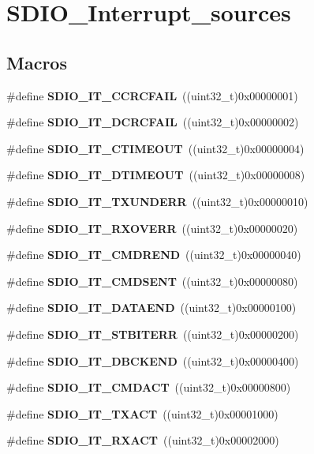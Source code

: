 \section{S\+D\+I\+O\+\_\+\+Interrupt\+\_\+sources}
\label{group__SDIO__Interrupt__sources}
\subsection*{Macros}
\begin{DoxyCompactItemize}
\item 
\#define \textbf{ S\+D\+I\+O\+\_\+\+I\+T\+\_\+\+C\+C\+R\+C\+F\+A\+IL}~((uint32\+\_\+t)0x00000001)
\item 
\#define \textbf{ S\+D\+I\+O\+\_\+\+I\+T\+\_\+\+D\+C\+R\+C\+F\+A\+IL}~((uint32\+\_\+t)0x00000002)
\item 
\#define \textbf{ S\+D\+I\+O\+\_\+\+I\+T\+\_\+\+C\+T\+I\+M\+E\+O\+UT}~((uint32\+\_\+t)0x00000004)
\item 
\#define \textbf{ S\+D\+I\+O\+\_\+\+I\+T\+\_\+\+D\+T\+I\+M\+E\+O\+UT}~((uint32\+\_\+t)0x00000008)
\item 
\#define \textbf{ S\+D\+I\+O\+\_\+\+I\+T\+\_\+\+T\+X\+U\+N\+D\+E\+RR}~((uint32\+\_\+t)0x00000010)
\item 
\#define \textbf{ S\+D\+I\+O\+\_\+\+I\+T\+\_\+\+R\+X\+O\+V\+E\+RR}~((uint32\+\_\+t)0x00000020)
\item 
\#define \textbf{ S\+D\+I\+O\+\_\+\+I\+T\+\_\+\+C\+M\+D\+R\+E\+ND}~((uint32\+\_\+t)0x00000040)
\item 
\#define \textbf{ S\+D\+I\+O\+\_\+\+I\+T\+\_\+\+C\+M\+D\+S\+E\+NT}~((uint32\+\_\+t)0x00000080)
\item 
\#define \textbf{ S\+D\+I\+O\+\_\+\+I\+T\+\_\+\+D\+A\+T\+A\+E\+ND}~((uint32\+\_\+t)0x00000100)
\item 
\#define \textbf{ S\+D\+I\+O\+\_\+\+I\+T\+\_\+\+S\+T\+B\+I\+T\+E\+RR}~((uint32\+\_\+t)0x00000200)
\item 
\#define \textbf{ S\+D\+I\+O\+\_\+\+I\+T\+\_\+\+D\+B\+C\+K\+E\+ND}~((uint32\+\_\+t)0x00000400)
\item 
\#define \textbf{ S\+D\+I\+O\+\_\+\+I\+T\+\_\+\+C\+M\+D\+A\+CT}~((uint32\+\_\+t)0x00000800)
\item 
\#define \textbf{ S\+D\+I\+O\+\_\+\+I\+T\+\_\+\+T\+X\+A\+CT}~((uint32\+\_\+t)0x00001000)
\item 
\#define \textbf{ S\+D\+I\+O\+\_\+\+I\+T\+\_\+\+R\+X\+A\+CT}~((uint32\+\_\+t)0x00002000)
\item 

\end{DoxyCompactItemize}
